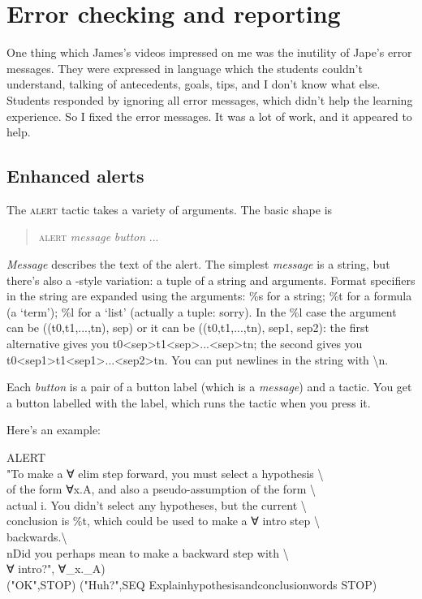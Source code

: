 \section{Error checking and reporting}
\label{sec:I2L:errors}

One thing which James's videos impressed on me was the inutility of Jape's error messages. They were expressed in language which the students couldn't understand, talking of antecedents, goals, tips, and I don't know what else. Students responded by ignoring all error messages, which didn't help the learning experience. So I fixed the error messages. It was a lot of work, and it appeared to help.

\subsection{Enhanced alerts}

The \textsc{alert} tactic takes a variety of arguments.  The basic shape is
\begin{quote}
\textsc{alert} \textit{message} \textit{button} ...
\end{quote}
\textit{Message} describes the text of the alert. The simplest \textit{message} is a string, but there's also a -style variation: a tuple of a string and arguments. Format specifiers in the string are expanded using the arguments: \%s for a string; \%t for a formula (a `term'); \%l for a `list' (actually a tuple: sorry). In the \%l case the argument can be ((t0,t1,...,tn), sep) or it can be ((t0,t1,...,tn), sep1, sep2): the first alternative gives you t0<sep>t1<sep>...<sep>tn; the second gives you t0<sep1>t1<sep1>...<sep2>tn. You can put newlines in the string with {\textbackslash}n.

Each \textit{button} is a pair of a button label (which is a \textit{message}) and a tactic. You get a button labelled with the label, which runs the tactic when you press it.

Here's an example:
\begin{japeish}
ALERT\\
\tab                "To make a ∀ elim step forward, you must select a hypothesis {\textbackslash} \\
\tab {\textbackslash}of the form ∀x.A, and also a pseudo-assumption of the form {\textbackslash}\\
\tab {\textbackslash}actual i. You didn't select any hypotheses, but the current {\textbackslash}\\
\tab {\textbackslash}conclusion is \%t, which could be used to make a ∀ intro step {\textbackslash}\\
\tab {\textbackslash}backwards.{\textbackslash}\\
\tab {\textbackslash}{\textbackslash}nDid you perhaps mean to make a backward step with {\textbackslash}\\
\tab {\textbackslash}∀ intro?", ∀\_x.\_A) \\
\tab ("OK",STOP) ("Huh?",SEQ Explainhypothesisandconclusionwords STOP)
\end{japeish}


